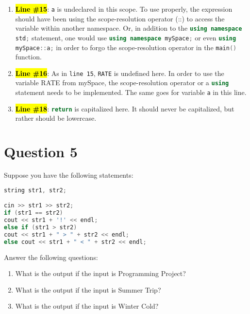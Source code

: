 \documentclass[a4paper, 10pt]{article}
\begin{document}
      \begin{enumerate}
          \item \hl{\textbf{Line \#15}}: \texttt{a} is undeclared in this scope. To use properly,
            the expression should have been using the scope-resolution operator (::) to access the
            variable within another namespace. Or, in addition to the
            \lstinline[language=c++,columns=fixed]{using namespace std;} statement,
            one would use \lstinline[language=c++,columns=fixed]{using namespace mySpace;}
            or even \lstinline[language=c++,columns=fixed]{using mySpace::a;} in order to forgo
            the scope-resolution operator in the \lstinline[language=c++,columns=fixed]{main()}
            function.
          \item \hl{\textbf{Line \#16}}: As in \texttt{line 15}, \texttt{RATE} is undefined here.
            In order to use the variable RATE from mySpace, the scope-resolution operator or a
            \lstinline[language=c++,columns=fixed]{using} statement needs to be implemented.
            The same goes for variable \texttt{a} in this line.
          \item \hl{\textbf{Line \#18}}: \lstinline[language=c++,columns=fixed]{return} is
            capitalized here. It should never be capitalized, but rather should be lowercase.
      \end{enumerate}


  \newpage
  \section{Question 5}
    Suppose you have the following statements:
    \begin{lstlisting}[language=c++]
string str1, str2;

cin >> str1 >> str2; 
if (str1 == str2) 
cout << str1 + '!' << endl; 
else if (str1 > str2) 
cout << str1 + " > " + str2 << endl; 
else cout << str1 + " < " + str2 << endl;
    \end{lstlisting}
    
    Answer the following questions:
      \begin{enumerate}[label=\Alph*.]
          \item What is the output if the input is Programming Project?
          \item What is the output if the input is Summer Trip?
          \item What is the output if the input is Winter Cold?
      \end{enumerate}
\end{document}

